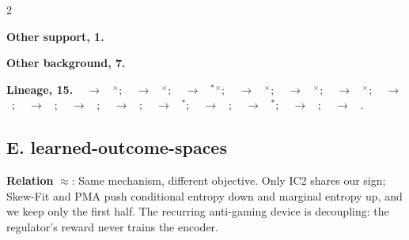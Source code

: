 \documentclass[10pt]{article}
\newcommand{\memb}[1]{\par\smallskip\textbf{#1}\quad}
\begin{document}
\begin{multicols}{2}
\memb{Other support, 1.} \citetext{\citealp{Feng-factored22}}

\memb{Other background, 7.} {\footnotesize \citetext{\citealp{Shivam-predictive19}; \citealp{AbuKhalaf-feedback21}; \citealp{Bastianello-internal22}; \citealp{Bianchin-internal24}; \citealp{Qian-eventtriggered24}; \citealp{Bianchin-feedback25}; \citealp{Yang-modeling25}}}

\end{multicols}
\memb{Lineage, 15.} {\footnotesize \citeauthor{Francis-internal76}~\citeyear{Francis-internal76} $\to$ \citeauthor{Sontag-adaptation03}~\citeyear{Sontag-adaptation03}$^\times$; \citeauthor{Francis-internal76}~\citeyear{Francis-internal76} $\to$ \citeauthor{Gao-adaptive16}~\citeyear{Gao-adaptive16}$^\times$; \citeauthor{Francis-internal76}~\citeyear{Francis-internal76} $\to$ \citeauthor{Rizvi-reinforcement22}~\citeyear{Rizvi-reinforcement22}$^\ast$$^\times$; \citeauthor{Yi-robust00}~\citeyear{Yi-robust00} $\to$ \citeauthor{Sontag-adaptation03}~\citeyear{Sontag-adaptation03}$^\times$; \citeauthor{Sontag-adaptation03}~\citeyear{Sontag-adaptation03} $\to$ \citeauthor{Andrews-signal06}~\citeyear{Andrews-signal06}$^\times$; \citeauthor{Sontag-adaptation03}~\citeyear{Sontag-adaptation03} $\to$ \citeauthor{Gupta-internal23}~\citeyear{Gupta-internal23}$^\times$; \citeauthor{Gao-adaptive16}~\citeyear{Gao-adaptive16} $\to$ \citeauthor{Qasem-adaptive22}~\citeyear{Qasem-adaptive22}; \citeauthor{Gao-adaptive16}~\citeyear{Gao-adaptive16} $\to$ \citeauthor{Qasem-autonomous23}~\citeyear{Qasem-autonomous23}; \citeauthor{Gao-adaptive16}~\citeyear{Gao-adaptive16} $\to$ \citeauthor{Zhao-incremental24}~\citeyear{Zhao-incremental24}; \citeauthor{Gao-adaptive16}~\citeyear{Gao-adaptive16} $\to$ \citeauthor{Jing-incremental25}~\citeyear{Jing-incremental25}; \citeauthor{Bin-adaptive19}~\citeyear{Bin-adaptive19} $\to$ \citeauthor{Bin-approximate21}~\citeyear{Bin-approximate21}$^\ast$; \citeauthor{Huang-action22}~\citeyear{Huang-action22} $\to$ \citeauthor{Feng-factored22}~\citeyear{Feng-factored22}; \citeauthor{Chen-robust21}~\citeyear{Chen-robust21} $\to$ \citeauthor{Lin-datadriven24}~\citeyear{Lin-datadriven24}$^\ast$; \citeauthor{Zhao-incremental24}~\citeyear{Zhao-incremental24} $\to$ \citeauthor{Jing-incremental25}~\citeyear{Jing-incremental25}; \citeauthor{Jing-incremental25}~\citeyear{Jing-incremental25} $\to$ \citeauthor{Zhao-incremental24}~\citeyear{Zhao-incremental24}.}

\subsection{E. learned-outcome-spaces}\label{node:S6-S6-E-learned-outcome-spaces}
\textbf{Relation} $\approx$: Same mechanism, different objective. Only IC2 shares our sign; Skew-Fit and PMA push conditional entropy down and marginal entropy up, and we keep only the first half. The recurring anti-gaming device is decoupling: the regulator's reward never trains the encoder.
\end{document}
